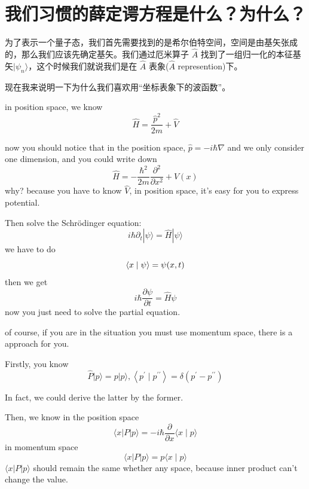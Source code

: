 \section{我们习惯的薛定谔方程是什么？为什么？}
为了表示一个量子态，我们首先需要找到的是希尔伯特空间，空间是由基矢张成的，那么我们应该先确定基矢。我们通过厄米算子 $\hat{A}$ 找到了一组归一化的本征基矢$|\psi_{n}\rangle$，这个时候我们就说我们是在 $\hat{A}$ 表象($\hat{A}$ represention)下。

现在我来说明一下为什么我们喜欢用“坐标表象下的波函数”。

in position space, we know
\begin{equation}
	\hat{H}=\frac{\hat{p}^2}{2 m}+\hat{V}
\end{equation}

now you should notice that in the position space, $\hat{p}=-i\hbar\nabla$ and we only consider one dimension, and you could write down
\begin{equation}
	\hat{H}=-\frac{\hbar^2}{2 m}\frac{\partial^2}{\partial x^2}+V(x)
\end{equation}
why? because you have to know $\hat{V}$, in position space, it's easy for you to express potential.

Then solve the Schrödinger equation:
\begin{equation}
	i\hbar\partial_t|\psi\rangle=\hat{H}|\psi\rangle
\end{equation}
we have to do
\begin{equation}
	\left\langle {x}
	\mathrel{\left | {\vphantom {x \psi }}
		\right. \kern-\nulldelimiterspace}
	{\psi } \right\rangle  = \psi (x,t)
\end{equation}
then we get
\begin{equation}
	i\hbar\frac{\partial\psi}{\partial t}=\hat{H}\psi
\end{equation}
now you just need to solve the partial equation.

of course, if you are in the situation you must use momentum space, there is a approach for you.

Firstly, you know
\begin{equation}
	\hat{P}|p\rangle=p|p\rangle,\left\langle p^{\prime}\mid p^{\prime\prime}\right\rangle=\delta\left(p^{\prime}-p^{\prime\prime}\right)
\end{equation}

In fact, we could derive the latter by the former.

Then, we know in the position space
\begin{equation}
	\langle x|P| p\rangle=-i\hbar\frac{\partial}{\partial x}\langle x\mid p\rangle
\end{equation}
in momentum space
\begin{equation}
	\langle x|P| p\rangle=p\langle x\mid p\rangle
\end{equation}
$\langle x|P| p\rangle$ should remain the same whether any space, because inner product can't change the value.

